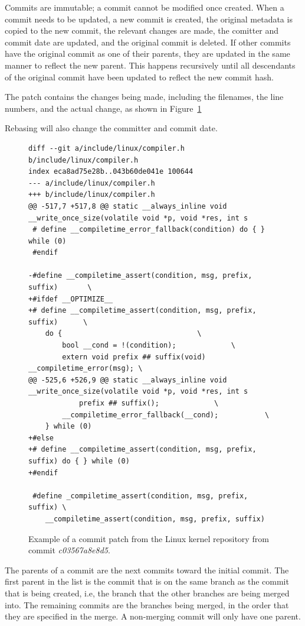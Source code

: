 Commits are immutable; a commit cannot be modified once created.
When a commit needs to be updated, a new commit is created,
the original metadata is copied to the new commit,
the relevant changes are made, the comitter
and commit date are updated, and the original commit is deleted.
If other commits have the original commit as one of their parents, they
are updated in the same manner to reflect the new parent.
This happens recursively until all descendants of the original commit
have been updated to reflect the new commit hash.

The patch contains the changes being made, including the
filenames, the line numbers, and the actual change, as shown in
Figure~\ref{fig:commit_patch}

Rebasing will also change the committer and commit date.

\begin{figure}[htpb]
  \centering
  \scriptsize{
  \begin{verbatim}
diff --git a/include/linux/compiler.h b/include/linux/compiler.h
index eca8ad75e28b..043b60de041e 100644
--- a/include/linux/compiler.h
+++ b/include/linux/compiler.h
@@ -517,7 +517,8 @@ static __always_inline void __write_once_size(volatile void *p, void *res, int s
 # define __compiletime_error_fallback(condition) do { } while (0)
 #endif

-#define __compiletime_assert(condition, msg, prefix, suffix)		\
+#ifdef __OPTIMIZE__
+# define __compiletime_assert(condition, msg, prefix, suffix)		\
 	do {								\
 		bool __cond = !(condition);				\
 		extern void prefix ## suffix(void) __compiletime_error(msg); \
@@ -525,6 +526,9 @@ static __always_inline void __write_once_size(volatile void *p, void *res, int s
 			prefix ## suffix();				\
 		__compiletime_error_fallback(__cond);			\
 	} while (0)
+#else
+# define __compiletime_assert(condition, msg, prefix, suffix) do { } while (0)
+#endif

 #define _compiletime_assert(condition, msg, prefix, suffix) \
 	__compiletime_assert(condition, msg, prefix, suffix)
  \end{verbatim}
}
  \caption{Example of a commit patch from the Linux kernel repository
    from commit \textit{c03567a8e8d5}.}
  \label{fig:commit_patch}
\end{figure}

The parents of a commit are the next commits toward the initial commit.
The first parent in the list is the commit that is on the same branch
as the commit that is being created, i.e, the branch that the other
branches are being merged into.
The remaining commits are the branches being merged, in the order that
they are specified in the merge.
A non-merging commit will only have one parent.

